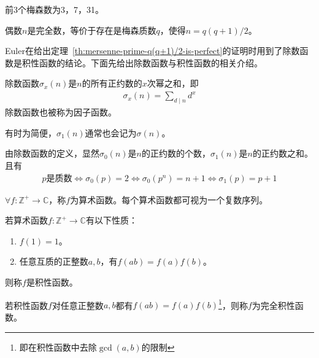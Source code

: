 前3个梅森数为3，7，31。

\begin{theorem}\label{th:mersenne-prime-q(q+1)/2-is-perfect}
  偶数$n$是完全数，等价于存在是梅森质数$q$，使得$n=q(q+1)/2$。
\end{theorem}

Euler在给出定理~\ref{th:mersenne-prime-q(q+1)/2-is-perfect}的证明时用到了除数函数是积性函数的结论。下面先给出除数函数与积性函数的相关介绍。

\begin{definition}
  除数函数$\sigma_x(n)$是$n$的所有正约数的$x$次幂之和，即
  \begin{align*}
    \sigma_x(n)=\sum_{d\mid n} d^x
  \end{align*}
  除数函数也被称为因子函数。
\end{definition}
有时为简便，$\sigma_1(n)$通常也会记为$\sigma(n)$。

由除数函数的定义，显然$\sigma_0(n)$是$n$的正约数的个数，$\sigma_1(n)$是$n$的正约数之和。且有
\begin{align*}
  p\text{是质数} \iff \sigma_0(p) = 2 \iff \sigma_0(p^n) = n + 1 \iff \sigma_1(p) = p + 1
\end{align*}

\begin{definition}
  $\forall f:\mathbb{Z^+}\to\mathbb{C}$，称$f$为算术函数。每个算术函数都可视为一个复数序列。
\end{definition}

\begin{definition}
  若算术函数$f:\mathbb{Z^+}\to \mathbb{C}$有以下性质：
  \begin{enumerate}
  \item $f(1) = 1$。
  \item 任意互质的正整数$a,b$，有$f(ab) = f(a)f(b)$。
  \end{enumerate}
  则称$f$是积性函数。
\end{definition}

\begin{definition}[完全积性函数]
  若积性函数$f$对任意正整数$a,b$都有$f(ab)=f(a)f(b)$\footnote{即在积性函数中去除$\gcd(a,b)$的限制}，则称$f$为完全积性函数。
\end{definition}

